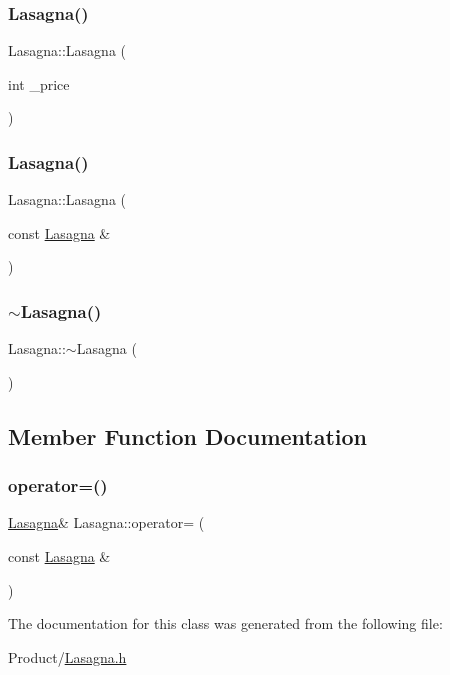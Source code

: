 \subsubsection{\texorpdfstring{Lasagna()}{Lasagna()}\hspace{0.1cm}{\footnotesize\ttfamily [1/2]}}
{\footnotesize\ttfamily Lasagna\+::\+Lasagna (\begin{DoxyParamCaption}\item[{int}]{\+\_\+price }\end{DoxyParamCaption})}

\mbox{\label{classLasagna_ad8f240976568ffeda2967f3a92f0a050}} 
\subsubsection{\texorpdfstring{Lasagna()}{Lasagna()}\hspace{0.1cm}{\footnotesize\ttfamily [2/2]}}
{\footnotesize\ttfamily Lasagna\+::\+Lasagna (\begin{DoxyParamCaption}\item[{const \mbox{\hyperlink{classLasagna}{Lasagna}} \&}]{ }\end{DoxyParamCaption})}

\mbox{\label{classLasagna_a5ef1f90e14286d828590c25710086991}} 
\subsubsection{\texorpdfstring{$\sim$Lasagna()}{~Lasagna()}}
{\footnotesize\ttfamily Lasagna\+::$\sim$\+Lasagna (\begin{DoxyParamCaption}{ }\end{DoxyParamCaption})}



\subsection{Member Function Documentation}
\mbox{\label{classLasagna_a8a7d37e51d0758e731bf07d1717cc8df}} 
\subsubsection{\texorpdfstring{operator=()}{operator=()}}
{\footnotesize\ttfamily \mbox{\hyperlink{classLasagna}{Lasagna}}\& Lasagna\+::operator= (\begin{DoxyParamCaption}\item[{const \mbox{\hyperlink{classLasagna}{Lasagna}} \&}]{ }\end{DoxyParamCaption})}



The documentation for this class was generated from the following file\+:\begin{DoxyCompactItemize}
\item 
Product/\mbox{\hyperlink{Lasagna_8h}{Lasagna.\+h}}\end{DoxyCompactItemize}
